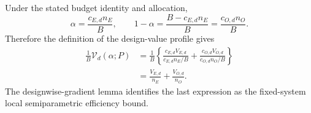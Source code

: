 Under the stated budget identity and allocation,
\[
 \alpha=\frac{c_{E,d}n_E}{B},\qquad
 1-\alpha=\frac{B-c_{E,d}n_E}{B}
 =\frac{c_{O,d}n_O}{B}.
\]
Therefore the definition of the design-value profile gives
\[
\begin{aligned}
 \frac1B\mathcal V_d(\alpha;P)
 &=\frac1B\left\{
 \frac{c_{E,d}V_{E,d}}{c_{E,d}n_E/B}
 +\frac{c_{O,d}V_{O,d}}{c_{O,d}n_O/B}\right\}\\
 &=\frac{V_{E,d}}{n_E}+\frac{V_{O,d}}{n_O}.
\end{aligned}
\]
The designwise-gradient lemma identifies the last expression as the fixed-system local semiparametric efficiency bound.